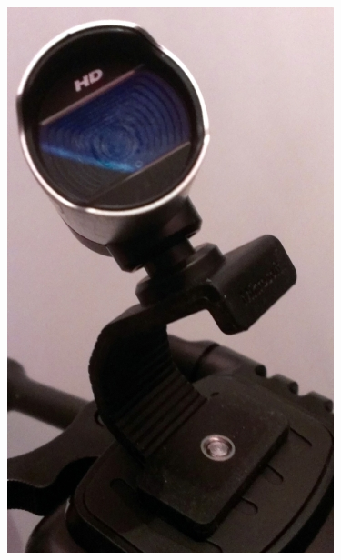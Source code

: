 \documentclass{scrartcl}
\begin{document}
\begin{figure}[H]
\centering
\begin{minipage}{.5\textwidth}
  \centering
  \includegraphics[width=.8\linewidth]{img/rotation.jpg}
\end{minipage}%
\begin{minipage}{.5\textwidth}
  \centering

\end{minipage}
\end{figure}
\end{document}
